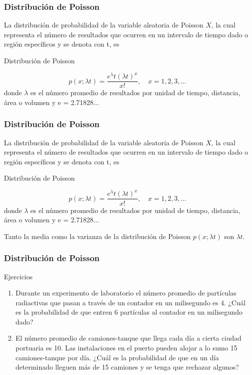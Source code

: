 \documentclass[spanish]{beamer}
\begin{document}
\begin{frame}
\frametitle{Distribución de Poisson}  
La distribución de probabilidad de la variable aleatoria de Poisson $X$, la cual representa el número de resultados que ocurren en un intervalo de tiempo dado o región específicos y se denota con t, es
\begin{block}{Distribución de Poisson}


\begin{equation*}
p(x;\lambda t)= \frac{e^\lambda  t (\lambda t)^x}{x!},  \quad x=1,2,3,\ldots
\end{equation*}
donde $\lambda$ es el número promedio de resultados por unidad de tiempo, distancia, área o volumen y e = 2.71828...

\end{block}

\end{frame}
\begin{frame}
\frametitle{Distribución de Poisson}  
La distribución de probabilidad de la variable aleatoria de Poisson $X$, la cual representa el número de resultados que ocurren en un intervalo de tiempo dado o región específicos y se denota con t, es
\begin{block}{Distribución de Poisson}


\begin{equation*}
p(x;\lambda t)= \frac{e^\lambda  t (\lambda t)^x}{x!},  \quad x=1,2,3,\ldots
\end{equation*}
donde $\lambda$ es el número promedio de resultados por unidad de tiempo, distancia, área o volumen y e = 2.71828...

\end{block}
Tanto la media como la varianza de la distribución de Poisson $p(x; \lambda t)$ son $\lambda t$.
\end{frame}
\begin{frame}
\frametitle{Distribución de Poisson}  
Ejercicios 
\begin{enumerate}
\item Durante un experimento de laboratorio el número promedio de partículas radiactivas que pasan a través de un contador en un milisegundo es 4. ¿Cuál es la probabilidad de
que entren 6 partículas al contador en un milisegundo dado?
\item El número promedio de camiones-tanque que llega cada día a cierta ciudad portuaria es 10. Las instalaciones en el puerto pueden alojar a lo sumo 15 camiones-tanque por día.
¿Cuál es la probabilidad de que en un día determinado lleguen más de 15 camiones y se
tenga que rechazar algunos?
\end{enumerate}
\end{frame}



\end{document}

